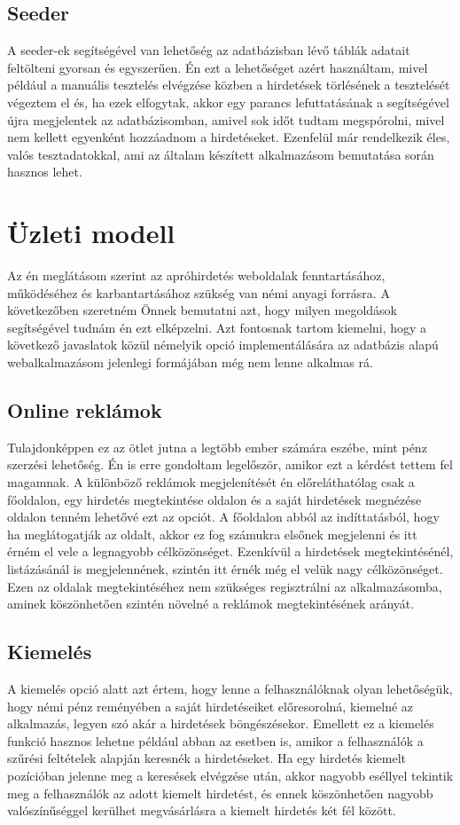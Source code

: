 \documentclass[]{thesis-ekf}
\theoremstyle{definition}
\theoremstyle{remark}
\begin{document}
	\section{Seeder}
		A seeder-ek segítségével van lehetőség az adatbázisban lévő táblák adatait feltölteni gyorsan és egyszerűen. Én ezt a lehetőséget azért használtam, mivel például a manuális tesztelés elvégzése közben a hirdetések törlésének a tesztelését végeztem el és, ha ezek elfogytak, akkor egy parancs lefuttatásának a segítségével újra megjelentek az adatbázisomban, amivel sok időt tudtam megspórolni, mivel nem kellett egyenként hozzáadnom a hirdetéseket. Ezenfelül már rendelkezik éles, valós tesztadatokkal, ami az általam készített alkalmazásom bemutatása során hasznos lehet.
		
	\chapter{Üzleti modell}
		Az én meglátásom szerint az apróhirdetés weboldalak fenntartásához, működéséhez és karbantartásához szükség van némi anyagi forrásra. A következőben szeretném Önnek bemutatni azt, hogy milyen megoldások segítségével tudnám én ezt elképzelni. Azt fontosnak tartom kiemelni, hogy a következő javaslatok közül némelyik opció implementálására az adatbázis alapú webalkalmazásom jelenlegi formájában még nem lenne alkalmas rá.
		 \section{Online reklámok}
		 	Tulajdonképpen ez az ötlet jutna a legtöbb ember számára eszébe, mint pénz szerzési lehetőség. Én is erre gondoltam legelőször, amikor ezt a kérdést tettem fel magamnak. A különböző reklámok megjelenítését én előreláthatólag csak a főoldalon, egy hirdetés megtekintése oldalon és a saját hirdetések megnézése oldalon tenném lehetővé ezt az opciót. A főoldalon abból az indíttatásból, hogy ha meglátogatják az oldalt, akkor ez fog számukra elsőnek megjelenni és itt érném el vele a legnagyobb célközönséget. Ezenkívül a hirdetések megtekintésénél, listázásánál is megjelennének, szintén itt érnék még el velük nagy célközönséget. Ezen az oldalak megtekintéséhez nem szükséges regisztrálni az alkalmazásomba, aminek köszönhetően szintén növelné a reklámok megtekintésének arányát.
		 \section{Kiemelés}
		 	A kiemelés opció alatt azt értem, hogy lenne a felhasználóknak olyan lehetőségük, hogy némi pénz reményében a saját hirdetéseiket előresorolná, kiemelné az alkalmazás, legyen szó akár a hirdetések böngészésekor. Emellett ez a kiemelés funkció hasznos lehetne például abban az esetben is, amikor a felhasználók a szűrési feltételek alapján keresnék a hirdetéseket. Ha egy hirdetés kiemelt pozícióban jelenne meg a keresések elvégzése után, akkor nagyobb eséllyel tekintik meg a felhasználók az adott kiemelt hirdetést, és ennek köszönhetően nagyobb valószínűséggel kerülhet megvásárlásra a kiemelt hirdetés két fél között.
\end{document}

